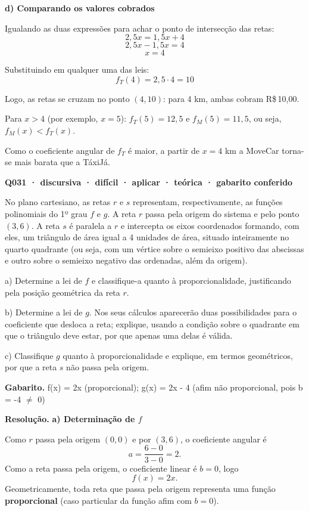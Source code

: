 \documentclass[11pt,a4paper]{article}
\begin{document}
\textbf{d) Comparando os valores cobrados}

Igualando as duas expressões para achar o ponto de intersecção das retas:
$$2{,}5x = 1{,}5x + 4$$
$$2{,}5x - 1{,}5x = 4$$
$$x = 4$$

Substituindo em qualquer uma das leis:
$$f_T(4) = 2{,}5 \cdot 4 = 10$$

Logo, as retas se cruzam no ponto $(4, 10)$: para 4 km, ambas cobram R\$\,10,00.

Para $x>4$ (por exemplo, $x=5$): $f_T(5)=12{,}5$ e $f_M(5)=11{,}5$, ou seja, $f_M(x) < f_T(x)$.

Como o coeficiente angular de $f_T$ é maior, a partir de $x=4$ km a MoveCar torna-se mais barata que a TáxiJá.

\bigskip\noindent\textbf{Q031 · discursiva · difícil · aplicar · teórica · gabarito conferido}\par\nopagebreak
No plano cartesiano, as retas $r$ e $s$ representam, respectivamente, as funções polinomiais do 1º grau $f$ e $g$. A reta $r$ passa pela origem do sistema e pelo ponto $(3,6)$. A reta $s$ é paralela a $r$ e intercepta os eixos coordenados formando, com eles, um triângulo de área igual a 4 unidades de área, situado inteiramente no quarto quadrante (ou seja, com um vértice sobre o semieixo positivo das abscissas e outro sobre o semieixo negativo das ordenadas, além da origem).

a) Determine a lei de $f$ e classifique-a quanto à proporcionalidade, justificando pela posição geométrica da reta $r$.

b) Determine a lei de $g$. Nos seus cálculos aparecerão duas possibilidades para o coeficiente que desloca a reta; explique, usando a condição sobre o quadrante em que o triângulo deve estar, por que apenas uma delas é válida.

c) Classifique $g$ quanto à proporcionalidade e explique, em termos geométricos, por que a reta $s$ não passa pela origem.

\textbf{Gabarito.} f(x) = 2x (proporcional); g(x) = 2x - 4 (afim não proporcional, pois b = -4 $\neq$ 0)

\textbf{Resolução.} \textbf{a) Determinação de $f$}

Como $r$ passa pela origem $(0,0)$ e por $(3,6)$, o coeficiente angular é
$$a = \frac{6-0}{3-0} = 2.$$
Como a reta passa pela origem, o coeficiente linear é $b=0$, logo
$$f(x) = 2x.$$
Geometricamente, toda reta que passa pela origem representa uma função \textbf{proporcional} (caso particular da função afim com $b=0$).
\end{document}
